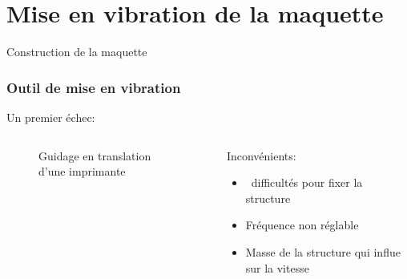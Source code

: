 \documentclass{beamer}
\begin{document}
\section{Mise en vibration de la maquette}
\begin{frame}{Construction de la maquette}
		\frametitle{Outil de mise en vibration}
Un premier échec:
		\begin{columns}
			\begin{column}{0.5\textwidth}
				\begin{figure}
					\caption{Guidage en translation d'une imprimante}
				\end{figure}
			\end{column}
			\begin{column}{0.5\textwidth}
				Inconvénients:
				\begin{itemize}
					\item\ difficultés pour fixer la structure
					\item Fréquence non réglable \\
					\item Masse de la structure qui influe sur la vitesse
				\end{itemize}

			\end{column}
		\end{columns}
	\end{frame}
	
\end{document}
